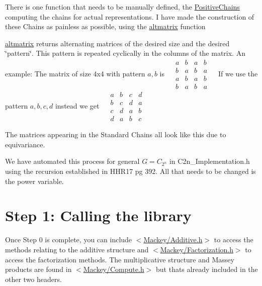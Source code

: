\begin{DoxyItemize}
\item There is one function that needs to be manually defined, the \hyperlink{classGroupSpecific_1_1Function_a6d247b31d297f733e9cd6f68921a37cd}{Positive\+Chains} computing the chains for actual representations. I have made the construction of these Chains as painless as possible, using the \hyperlink{namespaceMackey_aa2f105c9bcbec7f5c7524027174340a0}{altmatrix} function
\item \hyperlink{namespaceMackey_aa2f105c9bcbec7f5c7524027174340a0}{altmatrix} returns alternating matrices of the desired size and the desired \char`\"{}pattern\char`\"{}. This pattern is repeated cyclically in the columns of the matrix. An example\+: The matrix of size 4x4 with pattern $a,b$ is ~\newline
 $\begin{matrix} a&b&a&b\\ b&a&b&a\\ a&b&a&b \\ b&a&b&a \end{matrix}$ ~\newline
 If we use the pattern $a,b,c,d$ instead we get ~\newline
 $\begin{matrix} a&b&c&d\\ b&c&d&a\\ c&d&a&b \\ d&a&b&c \end{matrix}$ ~\newline

\item The matrices appearing in the Standard Chains all look like this due to equivariance.
\end{DoxyItemize}

We have automated this process for general $G=C_{2^n}$ in {\ttfamily C2n\+\_\+\+Implementation.\+h} using the recursion established in H\+H\+R17 pg 392. All that needs to be changed is the power variable.\hypertarget{use_next}{}\section{Step 1\+: Calling the library}\label{use_next}
Once Step 0 is complete, you can include {\ttfamily $<$\hyperlink{Additive_8h}{Mackey/\+Additive.\+h}$>$} to access the methods relating to the additive structure and {\ttfamily $<$\hyperlink{Factorization_8h}{Mackey/\+Factorization.\+h}$>$} to access the factorization methods. The multiplicative structure and Massey products are found in {\ttfamily $<$\hyperlink{Compute_8h}{Mackey/\+Compute.\+h}$>$} but that\textquotesingle{}s already included in the other two headers.

